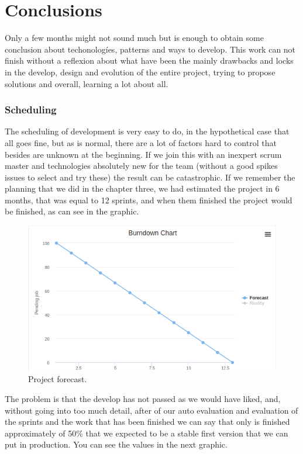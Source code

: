\chapter{Conclusions}

Only a few months might not sound much but is enough to obtain some
conclusion about techonologíes, patterns and ways to develop.
\intro
This work can not finish without a reflexion about what have been the mainly
drawbacks and locks in the develop, design and evolution of the entire project,
trying to propose solutions and overall, learning a lot about all.

\subsection{Scheduling}

The scheduling of development is very easy to do, in the hypothetical case that
all goes fine, but as is normal, there are a lot of factors hard to control that
besides are unknown at the beginning.
\intro
If we join this with an inexpert scrum master and technologies absolutely new for
the team (without a good spikes issues to select and try these) the result can
be catastrophic.
\intro
If we remember the planning that we did in the chapter three, we had estimated
the project in 6 months, that was equal to 12 sprints, and when them finished
the project would be finished, as can see in the graphic.

\begin{figure}[H]
  \includegraphics[scale=0.45]{img/graphics/burndown.png}
  \centering
  \caption{Project forecast.}
\end{figure}

\noindent The problem is that the develop has not passed as we would have liked,
and, without going into too much detail, after of our auto evaluation and
evaluation of the sprints and the work that has been finished we can say that
only is finished approximately of 50\% that we expected to be a stable first version
that we can put in production.
You can see the values in the next graphic.


